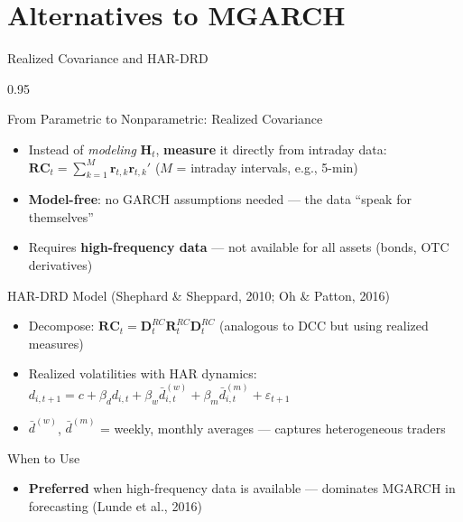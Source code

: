 \documentclass[9pt, aspectratio=169, t]{beamer}
\begin{document}
\section{Alternatives to MGARCH}

\begin{frame}{Realized Covariance and HAR-DRD}
    \begin{cminipage}{0.95\textwidth}
    \vspace{-3mm}
    {\scriptsize
    \begin{block}{From Parametric to Nonparametric: Realized Covariance}
        \begin{itemize}\setlength{\itemsep}{0pt}
            \item Instead of \textit{modeling} $\mathbf{H}_t$, \textbf{measure} it directly from intraday data: $\mathbf{RC}_t = \sum_{k=1}^{M} \mathbf{r}_{t,k}\mathbf{r}_{t,k}'$ ($M$ = intraday intervals, e.g., 5-min)
            \item \textbf{Model-free}: no GARCH assumptions needed --- the data ``speak for themselves''
            \item Requires \textbf{high-frequency data} --- not available for all assets (bonds, OTC derivatives)
        \end{itemize}
    \end{block}
    \vspace{-2mm}
    \begin{block}{HAR-DRD Model (Shephard \& Sheppard, 2010; Oh \& Patton, 2016)}
        \begin{itemize}\setlength{\itemsep}{0pt}
            \item Decompose: $\mathbf{RC}_t = \mathbf{D}_t^{RC}\mathbf{R}_t^{RC}\mathbf{D}_t^{RC}$ (analogous to DCC but using realized measures)
            \item Realized volatilities with HAR dynamics: $d_{i,t+1} = c + \beta_d d_{i,t} + \beta_w \bar{d}_{i,t}^{(w)} + \beta_m \bar{d}_{i,t}^{(m)} + \varepsilon_{t+1}$
            \item $\bar{d}^{(w)}$, $\bar{d}^{(m)}$ = weekly, monthly averages --- captures heterogeneous traders
        \end{itemize}
    \end{block}
    \vspace{-2mm}
    \begin{alertblock}{When to Use}
        \begin{itemize}\setlength{\itemsep}{0pt}
            \item \textbf{Preferred} when high-frequency data is available --- dominates MGARCH in forecasting (Lunde et al., 2016)
        \end{itemize}
    \end{alertblock}
    }
    \end{cminipage}
\end{frame}
\end{document}
